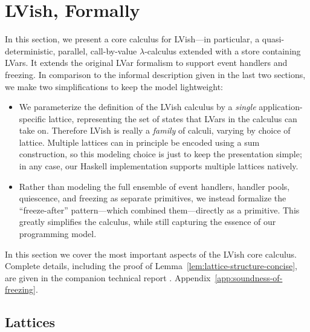 \section{LVish, Formally}\label{s:quasi-formal}


In this section, we present a core calculus for LVish---in particular, a
quasi-deterministic, parallel, call-by-value $\lambda$-calculus extended with a
store containing LVars.  It extends the original LVar formalism to support event
handlers and freezing.  In comparison to the informal description given in the
last two sections, we make two simplifications to keep the model lightweight:
\begin{itemize}
\item We parameterize the definition of the LVish calculus by a \emph{single}
  application-specific lattice, representing the set of states that LVars in the
  calculus can take on. Therefore LVish is really a \emph{family} of
  calculi, varying by choice of lattice.  Multiple lattices can in principle be
  encoded using a sum construction, so this modeling choice is just to keep the
  presentation simple; in any case, our Haskell implementation supports multiple
  lattices natively.
\item Rather than modeling the full ensemble of event handlers, handler pools,
  quiescence, and freezing as separate primitives, we instead formalize the
  ``freeze-after'' pattern---which combined them---directly as a primitive.
  This greatly simplifies the calculus, while still capturing the
  essence of our programming model.
\end{itemize}

\noindent In this section we cover the most important aspects of the
LVish core calculus.  Complete details, including the proof of
Lemma~\ref{lem:lattice-structure-concise},
 are given in
\ifx\fulltr\undefined
the companion
technical report \cite{Freeze-TR}.
\else
Appendix~\ref{app:soundness-of-freezing}.
\fi

\subsection{Lattices}

